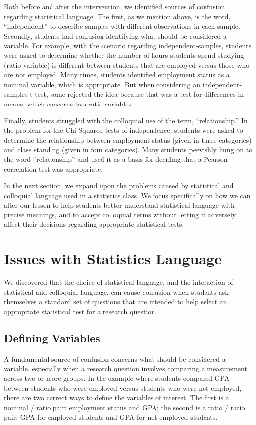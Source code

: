 \documentclass[12pt]{article}
\begin{document}
Both before and after the intervention, we identified sources of confusion regarding statistical language.  The first, as we mention above, is the word, ``independent'' to describe samples with different observations in each sample.  Secondly, students had confusion identifying what should be considered a variable.  For example, with the scenario regarding independent-samples, students were asked to determine whether the number of hours students spend studying (ratio variable) is different between students that are employed versus those who are not employed.  Many times, students identified employment status as a nominal variable, which is appropriate.  But when considering an independent-samples t-test, some rejected the idea because that was a test for differences in means, which concerns two ratio variables.  

Finally, students struggled with the colloquial use of the term, ``relationship.''  In the problem for the Chi-Squared tests of independence, students were asked to determine the relationship between employment status (given in three categories) and class standing (given in four categories).  Many students peevishly hung on to the word ``relationship'' and used it as a basis for deciding that a Pearson correlation test was appropriate.  

In the next section, we expand upon the problems caused by statistical and colloquial language used in a statistics class.  We focus specifically on how we can alter our lesson to help students better understand statistical language with precise meanings, and to accept colloquial terms without letting it adversely affect their decisions regarding appropriate statistical tests.

\section{Issues with Statistics Language}

We discovered that the choice of statistical language, and the interaction of statistical and colloquial language, can cause confusion when students ask themselves a standard set of questions that are intended to help select an appropriate statistical test for a research question. 

\subsection{Defining Variables}

A fundamental source of confusion concerns what should be considered a variable, especially when a research question involves comparing a measurement across two or more groups.  In the example where students compared GPA between students who were employed versus students who were not employed, there are two correct ways to define the variables of interest.  The first is a nominal / ratio pair: employment status and GPA; the second is a ratio / ratio pair: GPA for employed students and GPA for not-employed students.  
\end{document}

